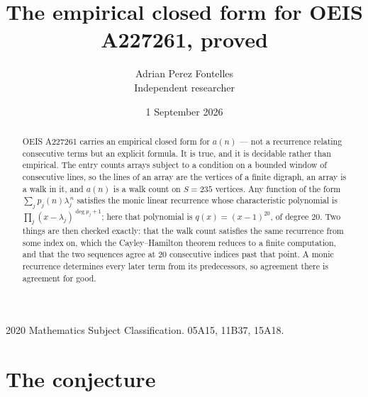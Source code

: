 \documentclass[11pt,a4paper]{article}
\title{The empirical closed form for OEIS A227261, proved}
\author{Adrian Perez Fontelles\\ \small Independent researcher}
\date{1 September 2026}
\theoremstyle{plain}
\theoremstyle{definition}
\begin{document}
\maketitle

\begin{abstract}
OEIS A227261 carries an empirical closed form for $a(n)$ --- not a recurrence relating
consecutive terms but an explicit formula. It is true, and it is decidable rather than
empirical. The entry counts arrays subject to a condition on a bounded window of consecutive lines, so the lines of an array are the
vertices of a finite digraph, an array is a walk in it, and $a(n)$ is a walk count on
$S=235$ vertices. Any function of the form $\sum_j p_j(n)\lambda_j^{\,n}$ satisfies the
monic linear recurrence whose characteristic polynomial is
$\prod_j(x-\lambda_j)^{\deg p_j+1}$; here that polynomial is $q(x)=(x-1)^{20}$, of degree
$20$. Two things are then checked exactly: that the walk count satisfies the same
recurrence from some index on, which the Cayley--Hamilton theorem reduces to a finite
computation, and that the two sequences agree at $20$ consecutive indices past that
point. A monic recurrence determines every later term from its predecessors, so agreement
there is agreement for good.
\end{abstract}

\noindent\small 2020 Mathematics Subject Classification. 05A15, 11B37, 15A18.\normalsize

\section{The conjecture}
\end{document}
